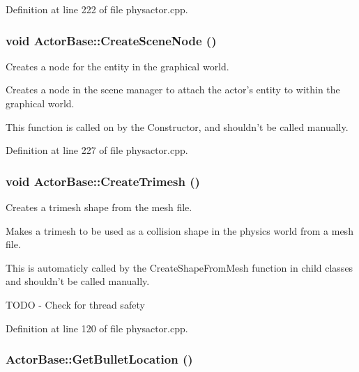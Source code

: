 Definition at line 222 of file physactor.cpp.

\hypertarget{classActorBase_a168cd57e20b2adfc5cae21627ddbae31}{
\subsubsection[{CreateSceneNode}]{\setlength{\rightskip}{0pt plus 5cm}void ActorBase::CreateSceneNode ()}}
\label{dd/d7b/classActorBase_a168cd57e20b2adfc5cae21627ddbae31}


Creates a node for the entity in the graphical world. 

Creates a node in the scene manager to attach the actor's entity to within the graphical world. \par
 This function is called on by the Constructor, and shouldn't be called manually. 

Definition at line 227 of file physactor.cpp.

\hypertarget{classActorBase_af7f0806222c79b5d5120dccefd93715e}{
\subsubsection[{CreateTrimesh}]{\setlength{\rightskip}{0pt plus 5cm}void ActorBase::CreateTrimesh ()}}
\label{dd/d7b/classActorBase_af7f0806222c79b5d5120dccefd93715e}


Creates a trimesh shape from the mesh file. 

Makes a trimesh to be used as a collision shape in the physics world from a mesh file. \par
 This is automaticly called by the CreateShapeFromMesh function in child classes and shouldn't be called manually. 

TODO -\/ Check for thread safety 



Definition at line 120 of file physactor.cpp.

\hypertarget{classActorBase_ae84ff822d2f962360bf291bb2c88eb3e}{
\subsubsection[{GetBulletLocation}]{ ActorBase::GetBulletLocation ()}}
\label{dd/d7b/classActorBase_ae84ff822d2f962360bf291bb2c88eb3e}


